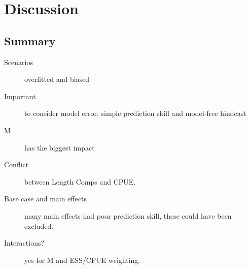 \section*{Discussion}


\subsection*{Summary}

 \begin{description}
   \item[Scenarios] overfitted and biased
   \item[Important] to consider model error, simple prediction skill and model-free hindcast
   \item[M] has the biggest impact
   \item[Conflict] between Length Comps and CPUE.
   \item[Base case and main effects] many main effects had poor prediction skill, these could have been excluded. 
   \item[Interactions?] yes for M and ESS/CPUE weighting.
\end{description}
   
